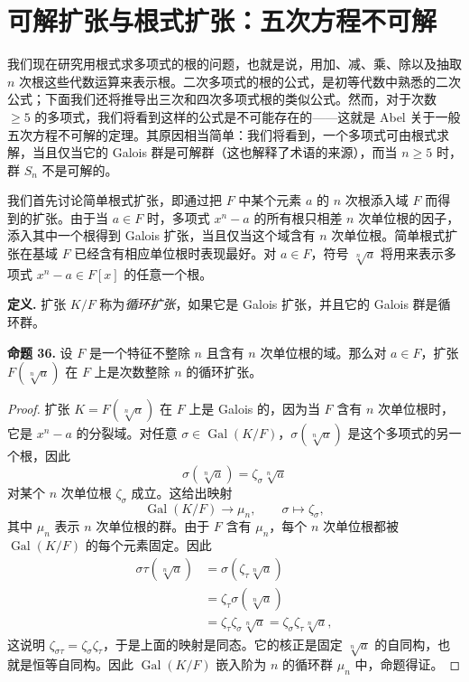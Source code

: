 \section{可解扩张与根式扩张：五次方程不可解}

我们现在研究用根式求多项式的根的问题，也就是说，用加、减、乘、除以及抽取 $n$ 次根这些代数运算来表示根。二次多项式的根的公式，是初等代数中熟悉的二次公式；下面我们还将推导出三次和四次多项式根的类似公式。然而，对于次数 $\geq 5$ 的多项式，我们将看到这样的公式是不可能存在的——这就是 Abel 关于一般五次方程不可解的定理。其原因相当简单：我们将看到，一个多项式可由根式求解，当且仅当它的 Galois 群是可解群（这也解释了术语的来源），而当 $n\geq 5$ 时，群 $S_n$ 不是可解的。

我们首先讨论简单根式扩张，即通过把 $F$ 中某个元素 $a$ 的 $n$ 次根添入域 $F$ 而得到的扩张。由于当 $a\in F$ 时，多项式 $x^n-a$ 的所有根只相差 $n$ 次单位根的因子，添入其中一个根得到 Galois 扩张，当且仅当这个域含有 $n$ 次单位根。简单根式扩张在基域 $F$ 已经含有相应单位根时表现最好。对 $a\in F$，符号 $\sqrt[n]{a}$ 将用来表示多项式 $x^n-a\in F[x]$ 的任意一个根。

\noindent\textbf{定义.} 扩张 $K/F$ 称为\emph{循环扩张}，如果它是 Galois 扩张，并且它的 Galois 群是循环群。

\noindent\textbf{命题 36.} 设 $F$ 是一个特征不整除 $n$ 且含有 $n$ 次单位根的域。那么对 $a\in F$，扩张 $F(\sqrt[n]{a})$ 在 $F$ 上是次数整除 $n$ 的循环扩张。

\begin{proof}
扩张 $K=F(\sqrt[n]{a})$ 在 $F$ 上是 Galois 的，因为当 $F$ 含有 $n$ 次单位根时，它是 $x^n-a$ 的分裂域。对任意 $\sigma\in\operatorname{Gal}(K/F)$，$\sigma(\sqrt[n]{a})$ 是这个多项式的另一个根，因此
\[
\sigma(\sqrt[n]{a})=\zeta_\sigma\sqrt[n]{a}
\]
对某个 $n$ 次单位根 $\zeta_\sigma$ 成立。这给出映射
\[
\operatorname{Gal}(K/F)\longrightarrow \mu_n,
\qquad
\sigma\longmapsto \zeta_\sigma,
\]
其中 $\mu_n$ 表示 $n$ 次单位根的群。由于 $F$ 含有 $\mu_n$，每个 $n$ 次单位根都被 $\operatorname{Gal}(K/F)$ 的每个元素固定。因此
\[
\begin{aligned}
\sigma\tau(\sqrt[n]{a})
&=\sigma(\zeta_\tau\sqrt[n]{a})\\
&=\zeta_\tau\sigma(\sqrt[n]{a})\\
&=\zeta_\tau\zeta_\sigma\sqrt[n]{a}
=\zeta_\sigma\zeta_\tau\sqrt[n]{a},
\end{aligned}
\]
这说明 $\zeta_{\sigma\tau}=\zeta_\sigma\zeta_\tau$，于是上面的映射是同态。它的核正是固定 $\sqrt[n]{a}$ 的自同构，也就是恒等自同构。因此 $\operatorname{Gal}(K/F)$ 嵌入阶为 $n$ 的循环群 $\mu_n$ 中，命题得证。
\end{proof}

